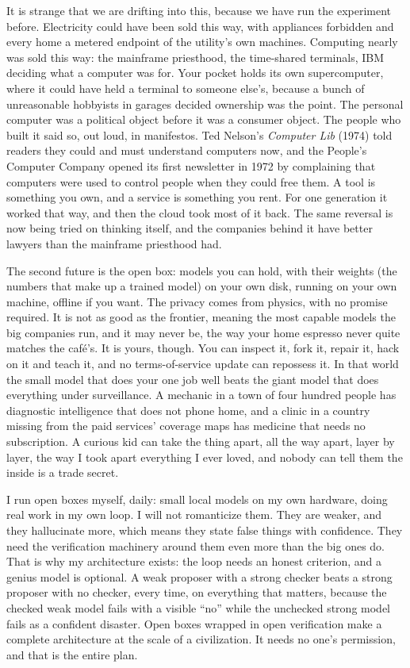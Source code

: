 \documentclass[11pt]{article}
\begin{document}
It is strange that we are drifting into this, because we have run the experiment before. Electricity could have been sold this way, with appliances forbidden and every home a metered endpoint of the utility's own machines. Computing nearly was sold this way: the mainframe priesthood, the time-shared terminals, IBM deciding what a computer was for. Your pocket holds its own supercomputer, where it could have held a terminal to someone else's, because a bunch of unreasonable hobbyists in garages decided ownership was the point. The personal computer was a political object before it was a consumer object. The people who built it said so, out loud, in manifestos. Ted Nelson's \emph{Computer Lib} (1974) told readers they could and must understand computers now, and the People's Computer Company opened its first newsletter in 1972 by complaining that computers were used to control people when they could free them. A tool is something you own, and a service is something you rent. For one generation it worked that way, and then the cloud took most of it back. The same reversal is now being tried on thinking itself, and the companies behind it have better lawyers than the mainframe priesthood had.

The second future is the open box: models you can hold, with their weights (the numbers that make up a trained model) on your own disk, running on your own machine, offline if you want. The privacy comes from physics, with no promise required. It is not as good as the frontier, meaning the most capable models the big companies run, and it may never be, the way your home espresso never quite matches the café's. It is yours, though. You can inspect it, fork it, repair it, hack on it and teach it, and no terms-of-service update can repossess it. In that world the small model that does your one job well beats the giant model that does everything under surveillance. A mechanic in a town of four hundred people has diagnostic intelligence that does not phone home, and a clinic in a country missing from the paid services' coverage maps has medicine that needs no subscription. A curious kid can take the thing apart, all the way apart, layer by layer, the way I took apart everything I ever loved, and nobody can tell them the inside is a trade secret.

I run open boxes myself, daily: small local models on my own hardware, doing real work in my own loop. I will not romanticize them. They are weaker, and they hallucinate more, which means they state false things with confidence. They need the verification machinery around them even more than the big ones do. That is why my architecture exists: the loop needs an honest criterion, and a genius model is optional. A weak proposer with a strong checker beats a strong proposer with no checker, every time, on everything that matters, because the checked weak model fails with a visible ``no'' while the unchecked strong model fails as a confident disaster. Open boxes wrapped in open verification make a complete architecture at the scale of a civilization. It needs no one's permission, and that is the entire plan.
\end{document}
